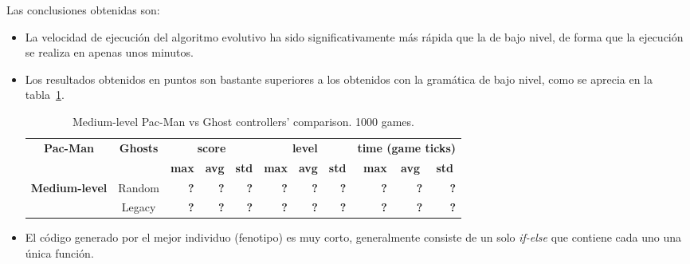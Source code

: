 Las conclusiones obtenidas son:
\begin{itemize}
\item La velocidad de ejecución del algoritmo evolutivo ha sido significativamente más rápida que la de bajo nivel, de forma que la ejecución se realiza en apenas unos minutos.

\item Los resultados obtenidos en puntos son bastante superiores a los obtenidos con la gramática de bajo nivel, como se aprecia en la tabla~\ref{table:single_obj_medium}.

\begin{table}[]
\centering
\begin{tabular}{|l|c|r|r|r|r|r|r|r|r|r|}
\hline
\multicolumn{1}{|c|}{\multirow{2}{*}{\textbf{Pac-Man}}} & \multirow{2}{*}{\textbf{Ghosts}} & \multicolumn{3}{c|}{\textbf{score}} & \multicolumn{3}{c|}{\textbf{level}} & \multicolumn{3}{c|}{\textbf{time (game ticks)}} \\ \cline{3-11} 
\multicolumn{1}{|c|}{} &  & \textbf{max} & \multicolumn{1}{c|}{\textbf{avg}} & \multicolumn{1}{c|}{\textbf{std}} & \textbf{max} & \multicolumn{1}{c|}{\textbf{avg}} & \multicolumn{1}{c|}{\textbf{std}} & \textbf{max} & \multicolumn{1}{c|}{\textbf{avg}} & \multicolumn{1}{c|}{\textbf{std}} \\ \hline
\multirow{2}{*}{\textbf{Medium-level}} & Random & \multicolumn{1}{r|}{\textbf{?}} & \textbf{?} & \textbf{?} & \multicolumn{1}{r|}{\textbf{?}} & \textbf{?} & \textbf{?} & \multicolumn{1}{r|}{\textbf{?}} & \textbf{?} & \textbf{?} \\ \cline{2-11} 
 & Legacy & \multicolumn{1}{r|}{\textbf{?}} & \textbf{?} & \textbf{?} & \multicolumn{1}{r|}{\textbf{?}} & \textbf{?} & \textbf{?} & \multicolumn{1}{r|}{\textbf{?}} & \textbf{?} & \textbf{?} \\ \hline
\end{tabular}
\caption{Medium-level Pac-Man vs Ghost controllers' comparison. 1000 games.}
\label{table:single_obj_medium}
\end{table}

\item El código generado por el mejor individuo (fenotipo) es muy corto, generalmente consiste de un solo \textit{if-else} que contiene cada uno una única función.


\end{itemize}
